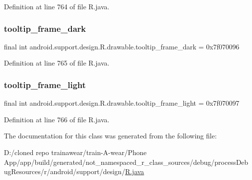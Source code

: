 Definition at line 764 of file R.\+java.

\mbox{\label{classandroid_1_1support_1_1design_1_1_r_1_1drawable_ad541536a37b940afd49330600c8e6fb1}} 
\subsubsection{\texorpdfstring{tooltip\_frame\_dark}{tooltip\_frame\_dark}}
{\footnotesize\ttfamily final int android.\+support.\+design.\+R.\+drawable.\+tooltip\+\_\+frame\+\_\+dark = 0x7f070096\hspace{0.3cm}{\ttfamily [static]}}



Definition at line 765 of file R.\+java.

\mbox{\label{classandroid_1_1support_1_1design_1_1_r_1_1drawable_aafa93bfc1b95635189723fd95253b79c}} 
\subsubsection{\texorpdfstring{tooltip\_frame\_light}{tooltip\_frame\_light}}
{\footnotesize\ttfamily final int android.\+support.\+design.\+R.\+drawable.\+tooltip\+\_\+frame\+\_\+light = 0x7f070097\hspace{0.3cm}{\ttfamily [static]}}



Definition at line 766 of file R.\+java.



The documentation for this class was generated from the following file\+:\begin{DoxyCompactItemize}
\item 
D\+:/cloned repo trainawear/train-\/\+A-\/wear/\+Phone App/app/build/generated/not\+\_\+namespaced\+\_\+r\+\_\+class\+\_\+sources/debug/process\+Debug\+Resources/r/android/support/design/\mbox{\hyperlink{process_debug_resources_2r_2android_2support_2design_2_r_8java}{R.\+java}}\end{DoxyCompactItemize}
